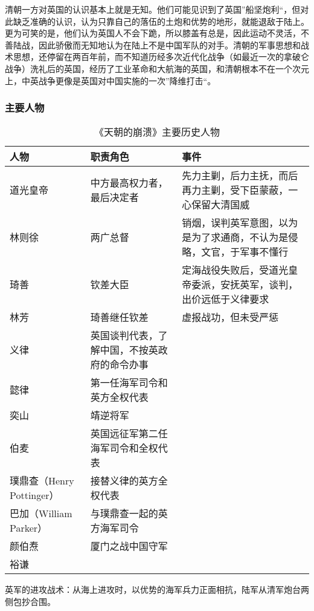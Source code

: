 清朝一方对英国的认识基本上就是无知。他们可能见识到了英国”船坚炮利“，但对此缺乏准确的认识，认为只靠自己的落伍的土炮和优势的地形，就能退敌于陆上。更为可笑的是，他们认为英国人不会下跪，所以膝盖有总是，因此运动不灵活，不善陆战，因此骄傲而无知地认为在陆上不是中国军队的对手。清朝的军事思想和战术思想，还停留在两百年前，而不知道历经多次近代化战争（如最近一次的拿破仑战争）洗礼后的英国，经历了工业革命和大航海的英国，和清朝根本不在一个次元上，中英战争更像是英国对中国实施的一次”降维打击“。

\subsubsection{主要人物}
\begin{longtable}{p{}|p{}|p{}}
\caption{《天朝的崩溃》主要历史人物}\\
\hline
人物 & 职责角色 & 事件 \\
\hline
\endhead

道光皇帝	& 中方最高权力者，最后决定者	 & 先力主剿，后力主抚，而后再力主剿，受下臣蒙蔽，一心保留大清国威 \\
林则徐	& 两广总督	& 销烟，误判英军意图，以为是为了求通商，不认为是侵略，文官，于军事不懂行 \\
琦善	& 钦差大臣	& 定海战役失败后，受道光皇帝委派，安抚英军，谈判，出价远低于义律要求 \\
林芳	& 琦善继任钦差 & 	虚报战功，但未受严惩 \\
义律	 &	英国谈判代表，了解中国，不按英政府的命令办事 \\
懿律	 & 第一任海军司令和英方全权代表	& \\
奕山	& 靖逆将军 & \\	
伯麦 & 	英国远征军第二任海军司令和全权代表 & \\
璞鼎查（Henry Pottinger）& 接替义律的英方全权代表	 & \\
巴加（William Parker）&	与璞鼎查一起的英方海军司令 & \\
颜伯焘 & 厦门之战中国守军 & \\	
裕谦	 & & \\
\hline
\end{longtable}

英军的进攻战术：从海上进攻时，以优势的海军兵力正面相抗，陆军从清军炮台两侧包抄合围。

